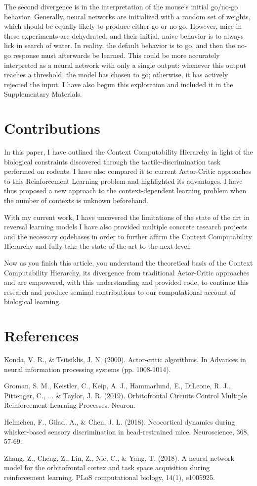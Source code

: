 \documentclass[]{article}
\begin{document}
The second divergence is in the interpretation of the mouse's initial go/no-go behavior.  Generally, neural networks are initialized with a random set of weights, which should be equally likely to produce either go or no-go.  However, mice in these experiments are dehydrated, and their initial, naive behavior is to always lick in search of water.  In reality, the default behavior is to go, and then the no-go response must afterwards be learned.  This could be more accurately interpreted as a neural network with only a single output: whenever this output reaches a threshold, the model has chosen to go; otherwise, it has actively rejected the input.  I have also begun this exploration and included it in the Supplementary Materials.

\section{Contributions}
In this paper, I have outlined the Context Computability Hierarchy in light of the biological constraints discovered through the tactile-discrimination task performed on rodents.  I have also compared it to current Actor-Critic approaches to this Reinforcement Learning problem and highlighted its advantages.  I have thus proposed a new approach to the context-dependent learning problem when the number of contexts is unknown beforehand.

With my current work, I have uncovered the limitations of the state of the art in reversal learning models  I have also provided multiple concrete research projects and the necessary codebases in order to further affirm the Context Computability Hierarchy and fully take the state of the art to the next level.

Now as you finish this article, you understand the theoretical basis of the Context Computability Hierarchy, its divergence from traditional Actor-Critic approaches and are empowered, with this understanding and provided code, to continue this research and produce seminal contributions to our computational account of biological learning.

\newpage

\section{References}

Konda, V. R., \& Tsitsiklis, J. N. (2000). Actor-critic algorithms. In Advances in neural information processing systems (pp. 1008-1014).

Groman, S. M., Keistler, C., Keip, A. J., Hammarlund, E., DiLeone, R. J., Pittenger, C., ... \& Taylor, J. R. (2019). Orbitofrontal Circuits Control Multiple Reinforcement-Learning Processes. Neuron.

Helmchen, F., Gilad, A., \& Chen, J. L. (2018). Neocortical dynamics during whisker-based sensory discrimination in head-restrained mice. Neuroscience, 368, 57-69.

Zhang, Z., Cheng, Z., Lin, Z., Nie, C., \& Yang, T. (2018). A neural network model for the orbitofrontal cortex and task space acquisition during reinforcement learning. PLoS computational biology, 14(1), e1005925.
\end{document}
